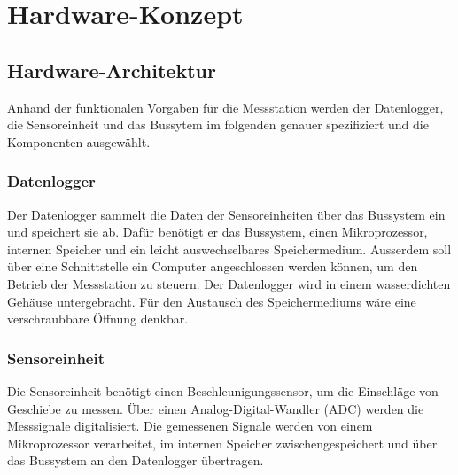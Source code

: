 %
%

\chapter{Hardware-Konzept}\label{chap.hardware}



\section{Hardware-Architektur}\label{sec.hw_arch}

Anhand der funktionalen Vorgaben für die Messstation werden der Datenlogger, die Sensoreinheit und das Bussytem im folgenden genauer spezifiziert und die Komponenten ausgewählt.

\subsection{Datenlogger}
Der Datenlogger sammelt die Daten der Sensoreinheiten über das Bussystem ein und speichert sie ab. Dafür benötigt er das Bussystem, einen Mikroprozessor, internen Speicher und ein leicht auswechselbares Speichermedium. Ausserdem soll über eine Schnittstelle ein Computer angeschlossen werden können, um den Betrieb der Messstation zu steuern. Der Datenlogger wird in einem wasserdichten Gehäuse untergebracht. Für den Austausch des Speichermediums wäre eine verschraubbare Öffnung denkbar.

\subsection{Sensoreinheit}
Die Sensoreinheit benötigt einen Beschleunigungssensor, um die Einschläge von Geschiebe zu messen. Über einen Analog-Digital-Wandler (ADC) werden die Messsignale digitalisiert. Die gemessenen Signale werden von einem Mikroprozessor verarbeitet, im internen Speicher zwischengespeichert und über das Bussystem an den Datenlogger übertragen.

